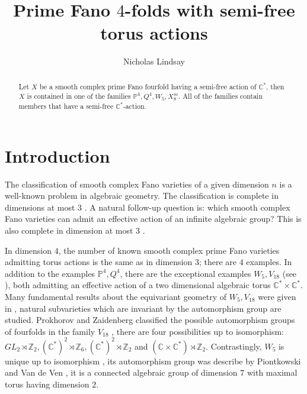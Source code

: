 \documentclass[12pt]{article}
\begin{document}
\title{Prime Fano $4$-folds with semi-free torus actions}

\author{Nicholas Lindsay}

\maketitle
\begin{abstract} 

Let $X$ be a smooth complex prime Fano fourfold having a semi-free action of $\mathbb{C}^*$, then $X$ is contained in one of the families $\mathbb{P}^4,Q^4,W_5, X^{m}_{8}$. All of the families contain members that have a semi-free $\mathbb{C}^*$-action.

\end{abstract}

\tableofcontents
\section{Introduction}
The classification of smooth complex Fano varieties of a given dimension $n$ is a well-known problem in algebraic geometry. The classification is complete in dimensions at most $3$ \cite{I1,I2,MM}. A natural follow-up question is: which smooth complex Fano varieties can admit an effective action of an infinite algebraic group? This is also complete in dimension at most $3$ \cite{CPS,KPS}. 

In dimension $4$, the number of known smooth complex prime Fano varieties admitting torus actions is the same as in dimension $3$; there are $4$ examples. In addition to the examples $\mathbb{P}^4,Q^4$, there are the exceptional examples $W_5,V_{18}$ (see \cite{PZ3}), both admitting an effective action of a two dimensional algebraic torus $\mathbb{C}^* \times \mathbb{C}^*$. Many fundamental results about the equivariant geometry of $W_5,V_{18}$ were given in \cite{PZ3}, natural subvarieties which are invariant by the automorphism group are studied.   Prokhorov and Zaidenberg classified the possible automorphism groups of fourfolds in the family $V_{18}$ \cite[Theorem A]{PZ4}, there are four possibilities up to isomorphism: $GL_2 \rtimes \mathbb{Z}_2, (\mathbb{C}^*)^2 \rtimes  \mathbb{Z}_{6}, (\mathbb{C}^*)^2 \rtimes  \mathbb{Z}_{2}$ and $(\mathbb{C} \times \mathbb{C}^*) \rtimes  \mathbb{Z}_2$. Contrastingly, $W_5$ is unique up to isomorphism \cite{Fu}, its automorphism group was describe by Piontkowski and Van de Ven \cite[Theorem 6.6]{PV}, it is a connected algebraic group of dimension $7$ with maximal torus having dimension $2$. 
\end{document}
